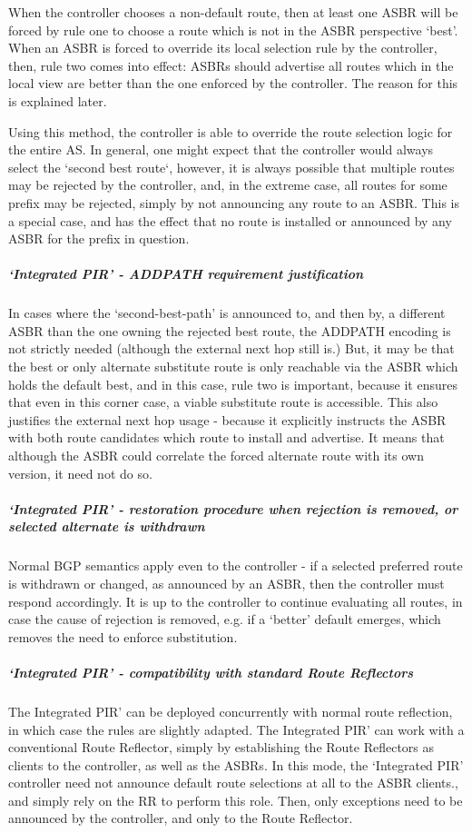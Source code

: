  When the controller chooses a non-default route, then at least one ASBR will be forced by rule one to choose a route which is not in the ASBR perspective `best'.  When an ASBR is forced to override its local selection rule by the controller, then, rule two comes into effect: ASBRs should advertise all routes which in the local view are better than the one enforced by the controller.  The reason for this is explained later.

 Using this method, the controller is able to override the route selection logic for the entire AS.  In general, one might expect that the controller would always select the `second best route`, however, it is always possible that multiple routes may be rejected by the controller, and, in the extreme case, all routes for some prefix may be rejected, simply by not announcing any route to an ASBR.  This is a special case, and has the effect that no route is installed or announced by any ASBR for the prefix in question.

\subparagraph{`Integrated PIR' - ADDPATH requirement justification}

In cases where the `second-best-path' is announced to, and then by, a different ASBR than the one owning the rejected best route, the ADDPATH encoding is not strictly needed (although the external next hop still is.)  But, it may be that the best or only alternate substitute route is only reachable via the ASBR which holds the default best, and in this case, rule two is important, because it ensures that even in this corner case, a viable substitute route is accessible.  This also justifies the external next hop usage - because it explicitly instructs the ASBR with both route candidates which route to install and advertise.  It means that although the ASBR could correlate the forced alternate route with its own version, it need not do so.

\subparagraph{`Integrated PIR' - restoration procedure when rejection is removed, or selected alternate is withdrawn}
Normal BGP semantics apply even to the controller - if a selected preferred route is withdrawn or changed, as announced by an ASBR, then 
the controller must respond accordingly.  It is up to the controller to continue evaluating all routes, in case the cause of rejection is removed, e.g. if a `better' default emerges, which removes the need to enforce substitution.

\subparagraph{`Integrated PIR' - compatibility with standard Route Reflectors}

The Integrated PIR' can be deployed concurrently with normal route reflection, in which case the rules are slightly adapted.  The Integrated PIR' can work with a conventional Route Reflector, simply by establishing the Route Reflectors as clients to the controller, as well as the ASBRs.  In this mode, the `Integrated PIR' controller need not announce default route selections at all to the ASBR clients., and simply rely on the RR to perform this role.  Then, only exceptions need to be announced by the controller, and only to the Route Reflector.

